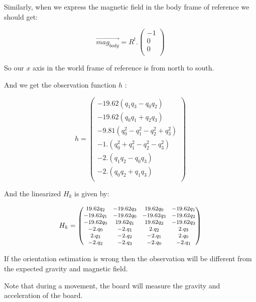 \documentclass[titlepage,a4,12pt]{article}
\newenvironment{mpmatrix}{\begin{medsize}\begin{pmatrix}}%
{\end{pmatrix}\end{medsize}}%
\numberwithin{equation}{subsection}
\begin{document}
Similarly, when we express the magnetic field in the body frame of reference we should get:

\begin{equation}\label{eq:magworld}
\overrightarrow{mag_{body}} = R^t . \left(
\begin{array}{c}
 -1 \\
 0 \\
 0 \\
\end{array}
\right)
\end{equation}

So our $x$ axis in the world frame of reference is from north to south.

And we get the observation function $h$ :

\begin{equation}\label{eq:h}
h = \left(
\begin{array}{c}
 -19.62 (q_1 q_3-q_0 q_2) \\
 -19.62 (q_0 q_1+q_2 q_3) \\
 -9.81 \left(q_0^2-q_1^2-q_2^2+q_3^2\right) \\
 -1. \left(q_0^2+q_1^2-q_2^2-q_3^2\right) \\
 -2. (q_1 q_2-q_0 q_3) \\
 -2. (q_0 q_2+q_1 q_3) \\
\end{array}
\right)
\end{equation}

And the linearized $H_k$ is given by:

\begin{equation}\label{eq:Hmatrix}
H_k=\begin{mpmatrix}
 19.62 q_2 & -19.62 q_3 & 19.62 q_0 & -19.62 q_1 \\
 -19.62 q_1 & -19.62 q_0 & -19.62 q_3 & -19.62 q_2 \\
 -19.62 q_0 & 19.62 q_1 & 19.62 q_2 & -19.62 q_3 \\
 -2. q_0 & -2. q_1 & 2. q_2 & 2. q_3 \\
 2. q_3 & -2. q_2 & -2. q_1 & 2. q_0 \\
 -2. q_2 & -2. q_3 & -2. q_0 & -2. q_1 \\
\end{mpmatrix}
\end{equation}

If the orientation estimation is wrong then the observation will be different from the expected gravity and magnetic field.

Note that during a movement, the board will measure the gravity and acceleration of the board.
\end{document}
